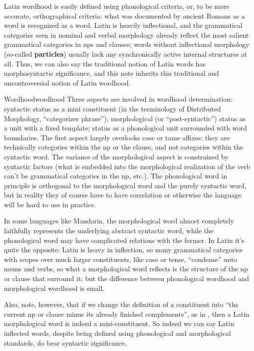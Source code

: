 \documentclass[a4paper, oneside]{report}
\newcommand*{\concept}[1]{\textbf{#1}}
\begin{document}
Latin wordhood is easily defined using phonological criteria,
or, to be more accurate, orthographical criteria: 
what was documented by ancient Romans as a word 
is recognized as a word.
Latin is heavily inflectional,
and the grammatical categories seen in nominal and verbal morphology 
already reflect the most salient grammatical categories
in \acs{np}s and clauses;
words without inflectional morphology (so-called \concept{particles}) 
usually lack any synchronically active internal structures at all.
Thus, we can also say the traditional notion of Latin words 
has morphosyntactic significance,
and this note inherits this traditional and uncontroversial notion of Latin wordhood.

\begin{infobox}{Wordhood}{wordhood}
    Three aspects are involved in wordhood determination:
    syntactic status as a mini constituent 
    (in the terminology of Distributed Morphology, ``categorizer phrase'');
    morphological (or ``post-syntactic'') status 
    as a unit with a fixed template;
    status as a phonological unit surrounded with word boundaries.
    The first aspect largely overlooks 
    case or \acs{tame} affixes:
    they are technically categories within the \acs{np} or the clause, 
    and not categories within the syntactic word.
    The variance of the morphological aspect is 
    constrained by syntactic factors 
    (what is embedded into the morphological realization of the verb 
    can't be grammatical categories in the \acs{np}, etc.).
    The phonological word in principle is orthogonal to 
    the morphological word and the purely syntactic word,
    but in reality they of course have to have correlation
    or otherwise the language will be hard to use in practice.
    
    In some languages like Mandarin, 
    the morphological word almost completely faithfully represents 
    the underlying abstract syntactic word, 
    while the phonological word may have complicated relations with the former.
    In Latin it's quite the opposite: 
    Latin is heavy in inflection, 
    so many grammatical categories with scopes over much larger constituents, 
    like case or tense, 
    ``condense'' unto nouns and verbs, 
    so what a morphological word reflects 
    is the structure of the \acs{np} or clause that surround it;
    but the difference between phonological wordhood 
    and morphological wordhood is small.
    
    Also, note, however, that if we change the definition of a constituent 
    into ``the current \acs{np} or clause minus its already finished complements'',
    as in ,
    then a Latin morphological word is indeed a mini-constituent.
    So indeed we can say Latin inflected words,
    despite being defined using phonological and morphological standards,
    do bear syntactic significance.
\end{infobox}
\end{document}
